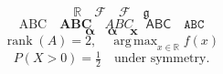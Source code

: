 \documentclass[11pt]{article}
\DeclareMathOperator*{\argmax}{arg\,max}
\begin{document}
\[\mathbb{R}\quad\mathcal{F}\quad\mathscr{F}\quad\mathfrak{g}\]
\[\mathrm{ABC}\quad\mathbf{ABC}\quad\mathit{ABC}\quad\mathsf{ABC}\quad\mathtt{ABC}\]
\[\boldsymbol{\alpha}\quad\bm{\alpha}\quad\mathbf{x}\]
\[\operatorname{rank}(A)=2,\quad \argmax_{x\in\mathbb{R}}f(x)\]
\[P(X>0)=\tfrac12\quad\text{under symmetry.}\]
\end{document}
